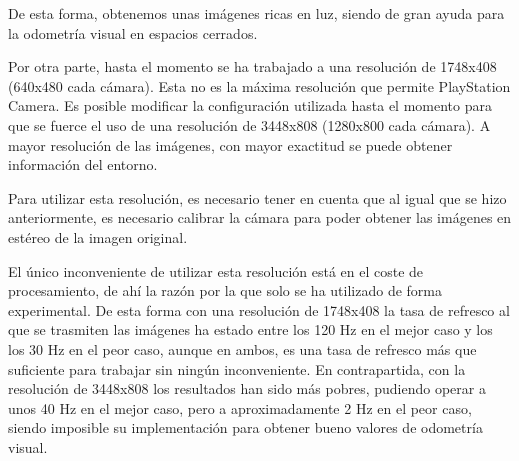 De esta forma, obtenemos unas imágenes ricas en luz, siendo de gran ayuda para
la odometría visual en espacios cerrados.

Por otra parte, hasta el momento se ha trabajado a una resolución de 1748x408
(640x480 cada cámara). Esta no es la máxima resolución que permite PlayStation
Camera. Es posible modificar la configuración utilizada hasta el momento para
que se fuerce el uso de una resolución de 3448x808 (1280x800 cada cámara). A
mayor resolución de las imágenes, con mayor exactitud se puede obtener
información del entorno.

Para utilizar esta resolución, es necesario tener en cuenta que al igual que se
hizo anteriormente, es necesario calibrar la cámara para poder obtener las
imágenes en estéreo de la imagen original.

El único inconveniente de utilizar esta resolución está en el coste de
procesamiento, de ahí la razón por la que solo se ha utilizado de forma
experimental. De esta forma con una resolución de 1748x408 la tasa de refresco
al que se trasmiten las imágenes ha estado entre los 120 Hz en el mejor caso y
los los 30 Hz en el peor caso, aunque en ambos, es una tasa de refresco más que
suficiente para trabajar sin ningún inconveniente. En contrapartida, con la
resolución de 3448x808 los resultados han sido más pobres, pudiendo operar a
unos 40 Hz en el mejor caso, pero a aproximadamente 2 Hz en el peor caso, siendo
imposible su implementación para obtener bueno valores de odometría visual.

